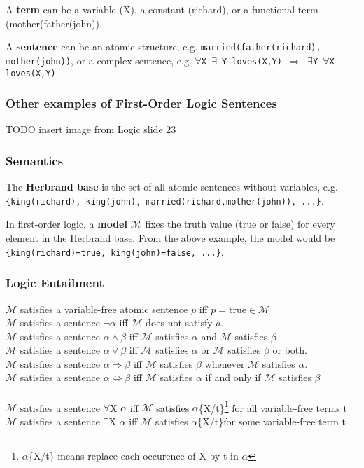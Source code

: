 A \textbf{term} can be a variable (X), a constant (richard), or a functional
term (mother(father(john)).

A \textbf{sentence} can be an atomic structure, e.g.
\texttt{married(father(richard), mother(john))}, or a complex sentence, e.g.
\texttt{$\forall$X $\exists$ Y loves(X,Y) $\Rightarrow$ $\exists$Y $\forall$X
loves(X,Y)}

\subsubsection{Other examples of First-Order Logic Sentences}
TODO insert image from Logic slide 23

\subsubsection{Semantics}
The \textbf{Herbrand base} is the set of all atomic sentences without
variables, e.g. \verb|{king(richard), king(john), married(richard,mother(john)), ...}|.

In first-order logic, a \textbf{model} $\mathcal{M}$ fixes the truth value
(true or false) for every element in the Herbrand base. From the above example,
the model would be \verb|{king(richard)=true, king(john)=false, ...}|.

\subsubsection{Logic Entailment}
$\mathcal{M}$ satisfies a variable-free atomic sentence $p$ iff $p = \text{true} \in \mathcal{M}$\\
$\mathcal{M}$ satisfies a sentence $\neg \alpha$ iff $\mathcal{M}$ does not satisfy $a$.\\
$\mathcal{M}$ satisfies a sentence $\alpha \land \beta$ iff $\mathcal{M}$
satisfies $\alpha$ and $\mathcal{M}$ satisfies $\beta$\\
$\mathcal{M}$ satisfies a sentence $\alpha \lor \beta$ iff $\mathcal{M}$
satisfies $\alpha$ or $\mathcal{M}$ satisfies $\beta$ or both.\\
$\mathcal{M}$ satisfies a sentence $\alpha \Rightarrow \beta$ iff $\mathcal{M}$
satisfies $\beta$ whenever $\mathcal{M}$ satisfies $\alpha$.\\
$\mathcal{M}$ satisfies a sentence $\alpha \Leftrightarrow \beta$ iff
$\mathcal{M}$ satisfies $\alpha$ if and only if $\mathcal{M}$ satisfies $\beta$\\\\
$\mathcal{M}$ satisfies a sentence $\forall$X $\alpha$ iff $\mathcal{M}$
satisfies $\alpha$\{X/t\}\footnote{$\alpha$\{X/t\} means replace each occurence of X by t in $\alpha$}
for all variable-free terms t\\
$\mathcal{M}$ satisfies a sentence $\exists$X $\alpha$ iff $\mathcal{M}$
satisfies $\alpha$\{X/t\}\footnotemark[1] for some variable-free term t

